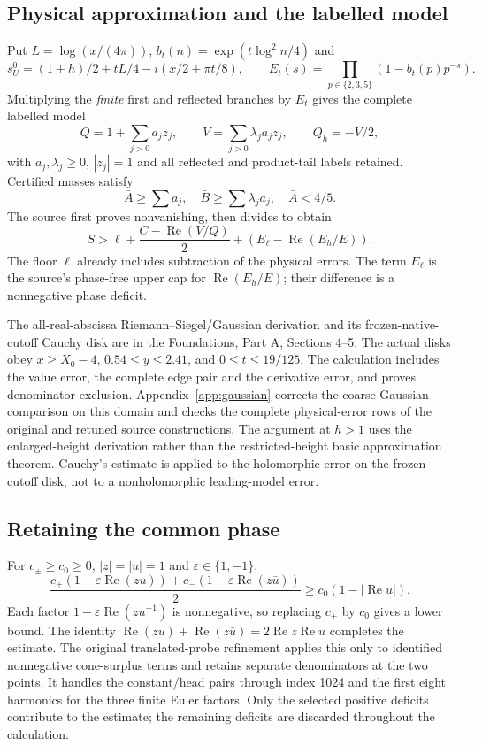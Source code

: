 \documentclass[11pt,a4paper]{article}
\theoremstyle{definition}\newtheorem{definition}[theorem]{Definition}
\theoremstyle{remark}\newtheorem{remark}[theorem]{Remark}
\newcommand{\Rea}{\operatorname{Re}}
\begin{document}
\subsection{Physical approximation and the labelled model}
Put $L=\log(x/(4\pi))$, $b_t(n)=\exp(t\log^2n/4)$ and
\[
s_U^0=(1+h)/2+tL/4-i(x/2+\pi t/8),\qquad
E_t(s)=\prod_{p\in\{2,3,5\}}(1-b_t(p)p^{-s}).
\]
Multiplying the \emph{finite} first and reflected branches by $E_t$ gives
the complete labelled model
\[
Q=1+\sum_{j>0}a_jz_j,\qquad
V=\sum_{j>0}\lambda_ja_jz_j,\qquad Q_h=-V/2,
\]
with $a_j,\lambda_j\ge0$, $|z_j|=1$ and all reflected and product-tail
labels retained. Certified masses satisfy
\[
\bar A\ge\sum a_j,\quad \bar B\ge\sum\lambda_ja_j,
\quad\bar A<4/5.
\]
The source first proves nonvanishing, then divides to obtain
\begin{equation}\label{eq:physical}
S>\ell+\frac{C-\Rea(V/Q)}2+
\left(E_\ell-\Rea(E_h/E)\right).
\end{equation}
The floor $\ell$ already includes subtraction of the physical errors.
The term $E_\ell$ is the source's phase-free upper cap for
$\Rea(E_h/E)$; their difference is a nonnegative phase deficit.

The all-real-abscissa Riemann--Siegel/Gaussian derivation and its frozen-native-
cutoff Cauchy disk are in the Foundations, Part A, Sections 4--5. The
actual disks obey $x\ge X_0-4$, $0.54\le y\le2.41$, and
$0\le t\le19/125$. The calculation includes the value error, the complete edge pair and the
derivative error, and proves denominator exclusion. Appendix~\ref{app:gaussian}
corrects the coarse Gaussian comparison on this domain and checks the complete
physical-error rows of the original and retuned source constructions. The argument at $h>1$ uses the enlarged-height
derivation rather than the restricted-height basic approximation theorem.
Cauchy's estimate is applied to the holomorphic error on the frozen-cutoff
disk, not to a nonholomorphic leading-model error.

\subsection{Retaining the common phase}
For $c_\pm\ge c_0\ge0$, $|z|=|u|=1$ and $\varepsilon\in\{1,-1\}$,
\begin{equation}\label{eq:phase}
\frac{c_+(1-\varepsilon\Rea(zu))+c_-(1-\varepsilon\Rea(z\bar u))}{2}
\ge c_0(1-|\Rea u|).
\end{equation}
Each factor $1-\varepsilon\Rea(zu^{\pm1})$ is nonnegative, so replacing
$c_\pm$ by $c_0$ gives a lower bound. The identity
$\Rea(zu)+\Rea(z\bar u)=2\Rea z\Rea u$ completes the estimate.
The original translated-probe refinement applies this only to identified
nonnegative cone-surplus terms and retains separate denominators at the
two points. It handles the constant/head pairs through index 1024 and the
first eight harmonics for the three finite Euler factors. Only the selected positive deficits contribute to the estimate; the
remaining deficits are discarded throughout the calculation.
\end{document}
